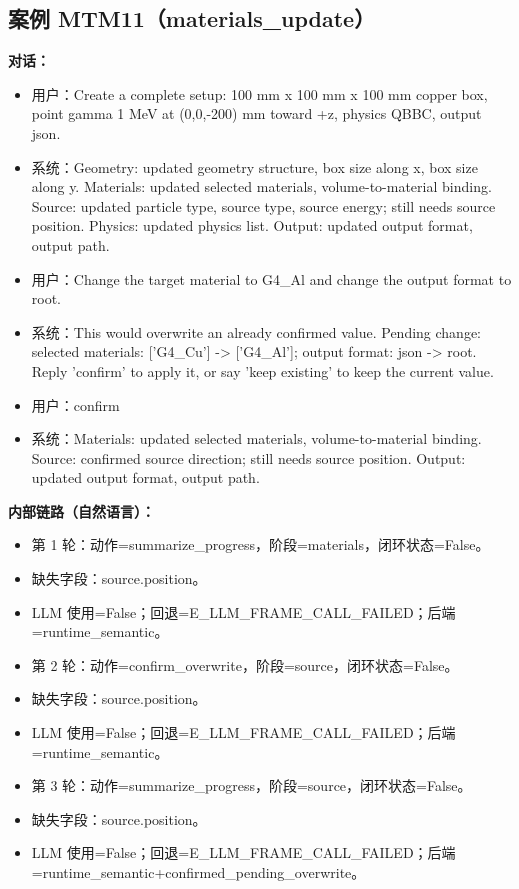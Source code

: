 \documentclass[11pt]{ctexart}
\begin{document}
\subsection{案例 MTM11（materials\_update）}
\textbf{对话：}
\begin{itemize}
\item 用户：Create a complete setup: 100 mm x 100 mm x 100 mm copper box, point gamma 1 MeV at (0,0,-200) mm toward +z, physics QBBC, output json.
\item 系统：Geometry: updated geometry structure, box size along x, box size along y. Materials: updated selected materials, volume-to-material binding. Source: updated particle type, source type, source energy; still needs source position. Physics: updated physics list. Output: updated output format, output path.
\item 用户：Change the target material to G4\_Al and change the output format to root.
\item 系统：This would overwrite an already confirmed value. Pending change: selected materials: ['G4\_Cu'] -> ['G4\_Al']; output format: json -> root. Reply 'confirm' to apply it, or say 'keep existing' to keep the current value.
\item 用户：confirm
\item 系统：Materials: updated selected materials, volume-to-material binding. Source: confirmed source direction; still needs source position. Output: updated output format, output path.
\end{itemize}
\textbf{内部链路（自然语言）：}
\begin{itemize}
\item 第 1 轮：动作=summarize\_progress，阶段=materials，闭环状态=False。
\item 缺失字段：source.position。
\item LLM 使用=False；回退=E\_LLM\_FRAME\_CALL\_FAILED；后端=runtime\_semantic。
\item 第 2 轮：动作=confirm\_overwrite，阶段=source，闭环状态=False。
\item 缺失字段：source.position。
\item LLM 使用=False；回退=E\_LLM\_FRAME\_CALL\_FAILED；后端=runtime\_semantic。
\item 第 3 轮：动作=summarize\_progress，阶段=source，闭环状态=False。
\item 缺失字段：source.position。
\item LLM 使用=False；回退=E\_LLM\_FRAME\_CALL\_FAILED；后端=runtime\_semantic+confirmed\_pending\_overwrite。
\end{itemize}
\end{document}
